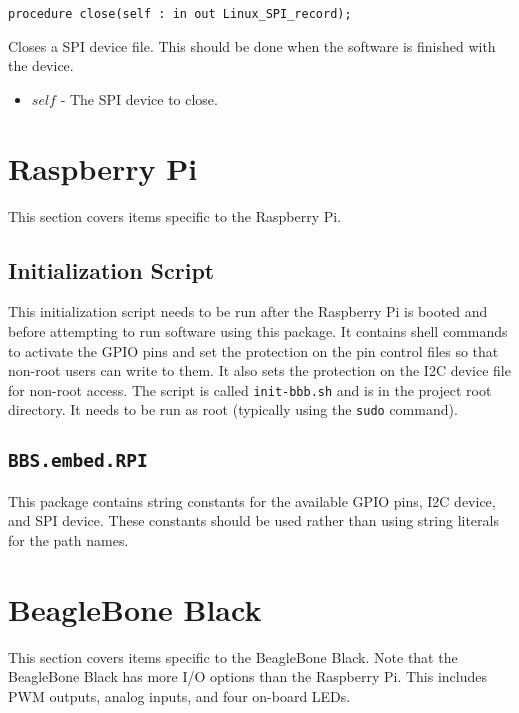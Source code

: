 \documentclass[10pt, openany]{book}
\newcommand{\indexfunc}[1]{\index[func]{#1}}
\newcommand{\package}[1]{\texttt{#1}}
\newcommand{\filename}[1]{\texttt{#1}}
\newcommand{\cli}[1]{\texttt{#1}}
\begin{document}
\begin{lstlisting}
procedure close(self : in out Linux_SPI_record);
\end{lstlisting}
\indexfunc{close}
Closes a SPI device file.  This should be done when the software is finished with the device.
\begin{itemize}
  \item $self$ - The SPI device to close.
\end{itemize}

\section{Raspberry Pi}
This section covers items specific to the Raspberry Pi.

\subsection{Initialization Script}
This initialization script needs to be run after the Raspberry Pi is booted and before attempting to run software using this package.  It contains shell commands to activate the GPIO pins and set the protection on the pin control files so that non-root users can write to them.  It also sets the protection on the I2C device file for non-root access.  The script is called \filename{init-bbb.sh} and is in the project root directory.  It needs to be run as root (typically using the \cli{sudo} command).

\subsection{\package{BBS.embed.RPI}}
This package contains string constants for the available GPIO pins, I2C device, and SPI device.  These constants should be used rather than using string literals for the path names.
\section{BeagleBone Black}
This section covers items specific to the BeagleBone Black.  Note that the BeagleBone Black has more I/O options than the Raspberry Pi.  This includes PWM outputs, analog inputs, and four on-board LEDs.
\end{document}

